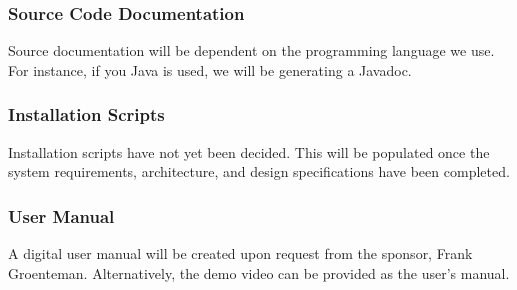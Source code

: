 \subsubsection{Source Code Documentation}
Source documentation will be dependent on the programming language we use. For instance, if you Java is used, we will be generating a Javadoc.






\subsubsection{Installation Scripts}
Installation scripts have not yet been decided. This will be populated once the system requirements, architecture, and design specifications have been completed.

\subsubsection{User Manual}
A digital user manual will be created upon request from the sponsor, Frank Groenteman. Alternatively, the demo video can be provided as the user’s manual.

